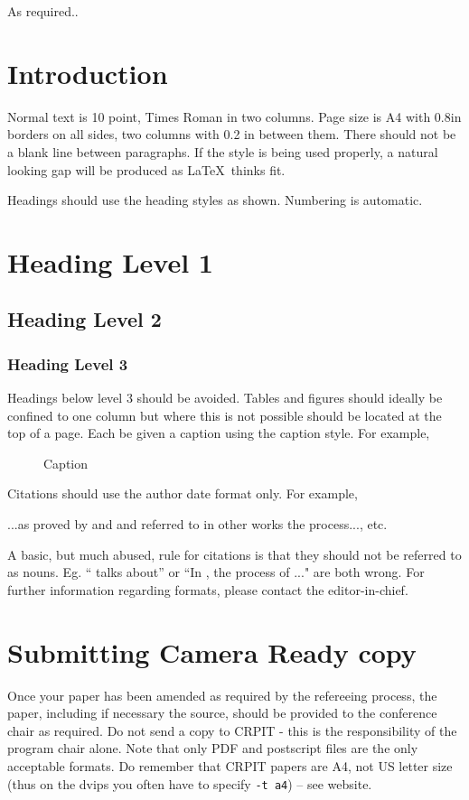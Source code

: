 \documentclass{CRPITStyle}
\renewcommand{\cite}{\citep}
\begin{document}
 As required..

\section{Introduction}
Normal text is 10 point, Times Roman in two columns.  Page size is A4 with 0.8in borders on all sides, two columns with 0.2 in between them.  There should not be a blank line between paragraphs.  If the style is being used properly, a natural looking gap will be produced as \LaTeX\ thinks fit.

Headings should use the heading styles as shown.  Numbering is automatic.

\section{Heading Level 1}
\subsection{Heading Level 2}
\subsubsection{Heading Level 3}
Headings below level 3 should be avoided.
Tables and figures should ideally be confined to one column but where this is not possible should be located at the top of a page.  Each be given a caption using the caption style. For example, 

\begin{figure}[htb]
\caption{\protect\label{xyz}  Caption}
\end{figure}

Citations should use the author date format only.  For example, 

...as proved by \citet{Snodgrass87} and \citet{FPS96} and referred to in other works \cite{BenZvi82,Bentley86,AIS93} the process..., etc.

A basic, but much abused, rule for citations is that they should not be referred to as nouns.  Eg. ``\cite{Snodgrass87} talks about'' or ``In  \cite{Snodgrass87}, the process of ..." are both wrong.
For further information regarding formats, please contact the editor-in-chief.

\section{Submitting Camera Ready copy}
Once your paper has been amended as required by the refereeing process, the paper, including if necessary the source, should be provided to the conference chair as required.  Do not send a copy to CRPIT - this is the responsibility of the program chair alone.  
Note that only PDF and postscript files are the only acceptable formats.  Do remember that CRPIT papers are A4, not US letter size (thus on the dvips you often have to specify {\tt -t a4}) -- see website.
\end{document}
